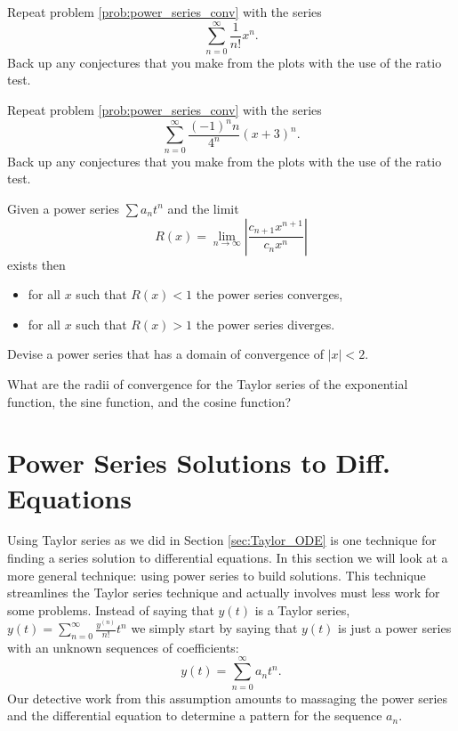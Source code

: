 \begin{problem}
    Repeat problem \ref{prob:power_series_conv} with the series
    \[ \sum_{n=0}^\infty \frac{1}{n!} x^n. \]
    Back up any conjectures that you make from the plots with the use of the ratio test.
\end{problem}

\begin{problem}
    Repeat problem \ref{prob:power_series_conv} with the series
    \[ \sum_{n=0}^\infty \frac{(-1)^n n}{4^n} (x+3)^n. \]
    Back up any conjectures that you make from the plots with the use of the ratio test.
\end{problem}



\begin{thm}
    Given a power series $\sum a_n t^n$ and the limit
    \[ R(x) = \lim_{n \to \infty} \left| \frac{c_{n+1}x^{n+1}}{c_{n}x^n} \right| \]
    exists then
    \begin{itemize}
        \item for all $x$ such that $R(x) < 1$ the power series converges,
        \item for all $x$ such that $R(x) > 1$ the power series diverges.
    \end{itemize}
\end{thm}

\begin{problem}
    Devise a power series that has a domain of convergence of $|x|<2$.
\end{problem}

\begin{problem}
    What are the radii of convergence for the Taylor series of the exponential function,
    the sine function, and the cosine function?
\end{problem}


\section{Power Series Solutions to Diff. Equations}
Using Taylor series as we did in Section \ref{sec:Taylor_ODE} is one technique for finding
a series solution to differential equations.  In this section we will look at a more
general technique: using power series to build solutions.  This technique streamlines the
Taylor series technique and actually involves must less work for some problems.  
Instead of
saying that $y(t)$ is a Taylor series, $y(t) = \sum_{n=0}^\infty \frac{y^{(n)}}{n!} t^n$
we simply start by saying that $y(t)$ is just a power series with an unknown sequences of
coefficients: 
\[ y(t) = \sum_{n=0}^\infty a_n t^n. \]  
Our detective work from this assumption amounts to massaging the power series and the
differential equation to determine a pattern for the sequence $a_n$.

